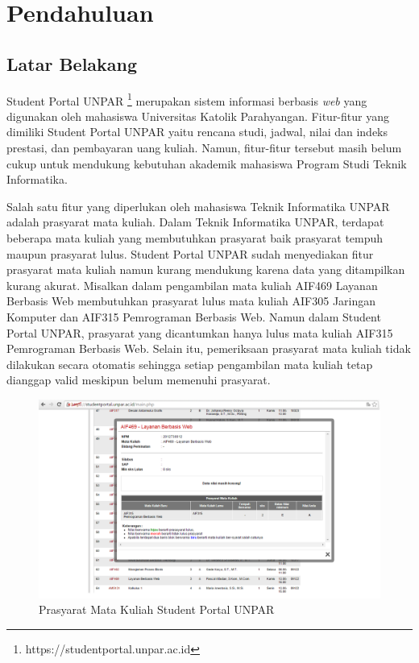 \chapter{Pendahuluan}
\label{chap:pendahuluan}

\section{Latar Belakang}
\label{sec:latar_belakang}

Student Portal UNPAR\cite{studentportalunpar} \footnote{https://studentportal.unpar.ac.id} merupakan sistem informasi berbasis \textit{web} yang digunakan oleh mahasiswa Universitas Katolik Parahyangan. Fitur-fitur yang dimiliki Student Portal UNPAR yaitu rencana studi, jadwal, nilai dan indeks prestasi, dan pembayaran uang kuliah. Namun, fitur-fitur tersebut masih belum cukup untuk mendukung kebutuhan akademik mahasiswa Program Studi Teknik Informatika. 

Salah satu fitur yang diperlukan oleh mahasiswa Teknik Informatika UNPAR adalah prasyarat mata kuliah. Dalam Teknik Informatika UNPAR, terdapat beberapa mata kuliah yang membutuhkan prasyarat baik prasyarat tempuh maupun prasyarat lulus. Student Portal UNPAR sudah menyediakan fitur prasyarat mata kuliah namun kurang mendukung karena data yang ditampilkan kurang akurat. Misalkan dalam pengambilan mata kuliah AIF469 Layanan Berbasis Web membutuhkan prasyarat lulus mata kuliah AIF305 Jaringan Komputer dan AIF315 Pemrograman Berbasis Web. Namun dalam Student Portal UNPAR, prasyarat yang dicantumkan hanya lulus mata kuliah AIF315 Pemrograman Berbasis Web. Selain itu, pemeriksaan prasyarat mata kuliah tidak dilakukan secara otomatis sehingga setiap pengambilan mata kuliah tetap dianggap valid meskipun belum memenuhi prasyarat.

\begin{figure}
	\centering
	\includegraphics[scale=0.5]{Gambar/contoh-portal}
	\caption{Prasyarat Mata Kuliah Student Portal UNPAR} 
	\label{fig:prasyarat_student_portal}
\end{figure}

